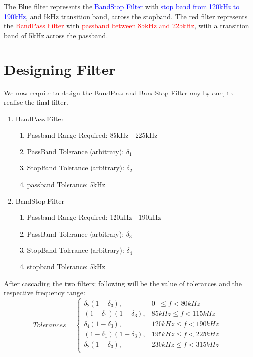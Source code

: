 \documentclass{article}
\begin{document}
The Blue filter represents the \textcolor{blue}{BandStop Filter} with \textcolor{blue}{stop band from 120kHz to 190kHz}, and 5kHz transition band, across the stopband. The red filter represents the \textcolor{red}{BandPass Filter} with \textcolor{red}{passband between 85kHz and 225kHz}, with a transition band of 5kHz across the passband. \\

\newpage
\section{Designing Filter}
We now require to design the BandPass and BandStop Filter ony by one, to realise the final filter.
\begin{enumerate}
    \item 
        BandPass Filter
        \begin{enumerate}
            \item Passband Range Required: 85kHz - 225kHz
            \item PassBand Tolerance (arbitrary): $\delta_1$
            \item StopBand Tolerance (arbitrary): $\delta_2$
            \item passband Tolerance: 5kHz
        \end{enumerate}
    \item 
        BandStop Filter
        \begin{enumerate}
            \item Passband Range Required: 120kHz - 190kHz
            \item PassBand Tolerance (arbitrary): $\delta_3$
            \item StopBand Tolerance (arbitrary): $\delta_4$
            \item stopband Tolerance: 5kHz
        \end{enumerate}
\end{enumerate}
After cascading the two filters; following will be the value of tolerances and the respective frequency range:
\[
    Tolerances =
    \begin{cases} 
        \delta_2(1-\delta_3), & 0^+ \leq f < 80kHz \\
        (1-\delta_1)(1-\delta_3), & 85kHz \leq f < 115kHz \\
        \delta_4(1-\delta_3), & 120kHz \leq f < 190kHz \\
        (1-\delta_1)(1-\delta_3), & 195kHz \leq f < 225kHz \\
        \delta_2(1-\delta_3), & 230kHz \leq f < 315kHz\\
    \end{cases}
\]
\end{document}

